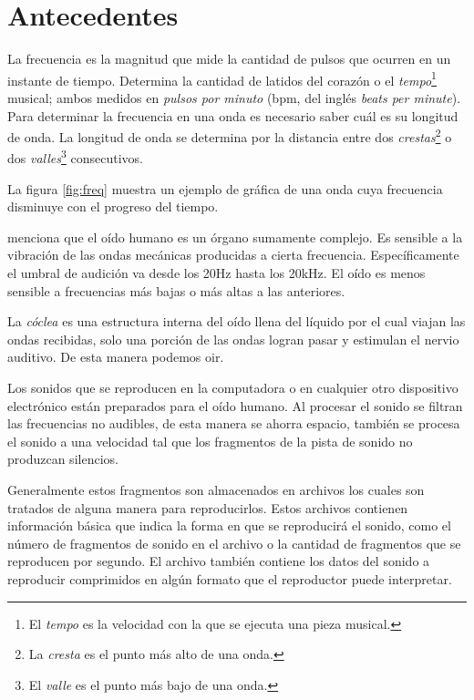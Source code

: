 \chapter{Antecedentes}
\label{chap:antec}

La frecuencia es la magnitud que mide la cantidad de pulsos que ocurren en un instante de tiempo. Determina la cantidad de latidos del coraz\'on o el {\em tempo}\footnote{El {\em tempo} es la velocidad con la que se ejecuta una pieza musical.} musical; ambos medidos en {\em pulsos por minuto} (bpm, del ingl\'es {\em beats per minute}). Para determinar la frecuencia en una onda es necesario saber cu\'al es su longitud de onda. La longitud de onda se determina por la distancia entre dos {\em crestas}\footnote{La {\em cresta} es el punto m\'as alto de una onda.} o dos {\em valles}\footnote{El {\em valle} es el punto m\'as bajo de una onda.} consecutivos.

\noindent La figura \ref{fig:freq} muestra un ejemplo de gr\'afica de una onda cuya frecuencia disminuye con el progreso del tiempo.



\noindent \citet{StevenAudio} menciona que el o\'ido humano es un \'organo sumamente complejo. Es sensible a la vibraci\'on de las ondas mec\'anicas producidas a cierta frecuencia. Espec\'ificamente el umbral de audici\'on va desde los 20Hz hasta los 20kHz. El o\'ido es menos sensible a frecuencias m\'as bajas o m\'as altas a las anteriores.

\noindent La {\em c\'oclea} es una estructura interna del o\'ido llena del l\'iquido por el cual viajan las ondas recibidas, solo una porci\'on de las ondas logran pasar y estimulan el nervio auditivo. De esta manera podemos oir.


\noindent Los sonidos que se reproducen en la computadora o en cualquier otro dispositivo electr\'onico est\'an preparados para el o\'ido humano. Al procesar el sonido se filtran las frecuencias no audibles, de esta manera se ahorra espacio, tambi\'en se procesa el sonido a una velocidad tal que los fragmentos de la pista de sonido no produzcan silencios.

\noindent Generalmente estos fragmentos son almacenados en archivos los cuales son tratados de alguna manera para reproducirlos. Estos archivos contienen informaci\'on b\'asica que indica la forma en que se reproducir\'a el sonido, como el n\'umero de fragmentos de sonido en el archivo o la cantidad de fragmentos que se reproducen por segundo. El archivo tambi\'en contiene los datos del sonido a reproducir comprimidos en alg\'un formato que el reproductor puede interpretar.

